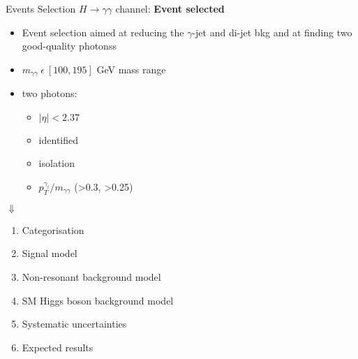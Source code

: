 \documentclass[10pt,UKenglish, leqno, xcolor = dvipsnames]{beamer}
\begin{document}
	\begin{frame}{Events Selection}
		\vfill
		$H \to \gamma\gamma$ channel: \textbf{Event selected}
		\begin{itemize}
			\item Event selection aimed at reducing the $\gamma$-jet and di-jet bkg and at finding two good-quality photonss
			\item $m_{\gamma\gamma}\ \epsilon\ [100,195]$ GeV mass range
			\item two photons:
			\begin{itemize}
				\item $|\eta|<2.37$
				\item identified
				\item isolation
				\item $p_T^{\gamma_i}/m_{\gamma\gamma}$ (>0.3, >0.25)
			\end{itemize}
		\end{itemize}
		\vspace{.3cm}
		\centering
		$\Downarrow$
		\begin{enumerate}\centering
			\item Categorisation
			\item Signal model
			\item Non-resonant background model
			\item SM Higgs boson background model
			\item Systematic uncertainties
			\item Expected results
		\end{enumerate}
		\vfill
	\end{frame}
	
\end{document}
